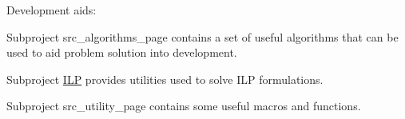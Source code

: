 Development aids\+:
\begin{DoxyItemize}
\item Subproject src\+\_\+algorithms\+\_\+page contains a set of useful algorithms that can be used to aid problem solution into development.
\item Subproject \hyperlink{src_ilp_page}{I\+LP} provides utilities used to solve I\+LP formulations.
\item Subproject src\+\_\+utility\+\_\+page contains some useful macros and functions. 
\end{DoxyItemize}